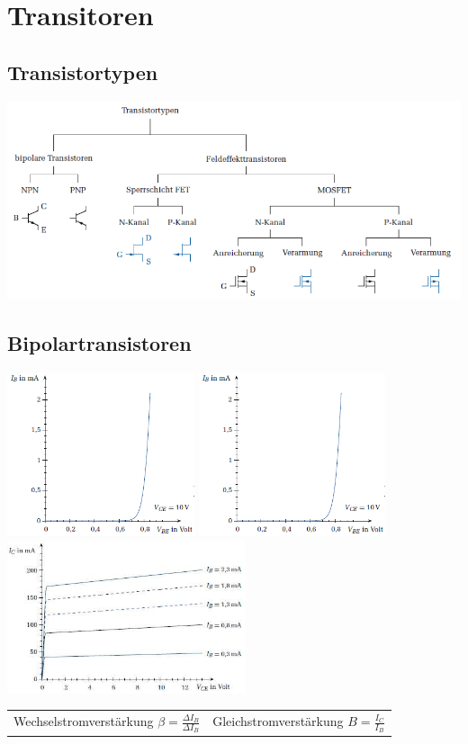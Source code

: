 \section{Transitoren}

\subsection{Transistortypen}
\includegraphics[width=18cm]{bilder/Transistortypen.png}

\subsection{Bipolartransistoren}
\includegraphics[width=5.5cm]{bilder/bipolarEingangsKennlinie}
\includegraphics[width=5.5cm]{bilder/bipolarVerstaerkungsKennlinie}
\includegraphics[width=7cm]{bilder/bipolarAusgangsKennlinie}\\
\begin{tabular}{ll}
	Wechselstromverstärkung $\beta = \frac{\Delta I_B}{\Delta I_B} $&
	Gleichstromverstärkung $B = \frac{I_C}{I_B}$\\
\end{tabular}

